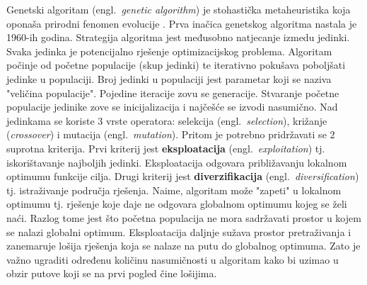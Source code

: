 \documentclass[times, utf8, diplomski]{fer}
\begin{document}
Genetski algoritam (engl.~\textit{genetic algorithm}) je stohastička metaheuristika koja oponaša prirodni fenomen evolucije \cite{book:evolution}. Prva inačica genetskog algoritma nastala je 1960-ih godina. Strategija algoritma jest međusobno natjecanje izmedu jedinki. Svaka jedinka je potencijalno rješenje optimizacijskog problema. Algoritam počinje od početne populacije (skup jedinki) te iterativno pokušava poboljšati jedinke u populaciji. Broj jedinki u populaciji jest parametar koji se naziva "veličina populacije". Pojedine iteracije zovu se generacije. Stvaranje početne populacije jedinike zove se inicijalizacija i najčešće se izvodi nasumično. Nad jedinkama se koriste $3$ vrste operatora: selekcija (engl.~\textit{selection}), križanje (\textit{crossover}) i mutacija (engl.~\textit{mutation}). Pritom je potrebno pridržavati se $2$ suprotna kriterija. Prvi kriterij jest \textbf{eksploatacija} (engl.~\textit{exploitation}) tj. iskorištavanje najboljih jedinki. Eksploatacija odgovara približavanju lokalnom optimumu funkcije cilja. Drugi kriterij jest \textbf{diverzifikacija} (engl.~\textit{diversification}) tj. istraživanje područja rješenja. Naime, algoritam može "zapeti" u lokalnom optimumu tj. rješenje koje daje ne odgovara globalnom optimumu kojeg se želi naći. Razlog tome jest što početna populacija ne mora sadržavati prostor u kojem se nalazi globalni optimum. Eksploatacija daljnje sužava prostor pretraživanja i zanemaruje lošija rješenja koja se nalaze na putu do globalnog optimuma. Zato je važno ugraditi određenu količinu nasumičnosti u algoritam kako bi uzimao u obzir putove koji se na prvi pogled čine lošijima.
\end{document}
